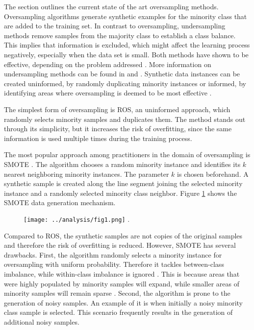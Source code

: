 \documentclass[parskip=full]{scrartcl}
\begin{document}
The section outlines the current state of the art oversampling methods. Oversampling algorithms generate synthetic examples for the minority class that are added to the training set. In contrast to oversampling, undersampling methods remove samples from the majority class to establish a class balance. This implies that information is excluded, which might affect the learning process negatively, especially when the data set is small. Both methods have shown to be effective, depending on the problem addressed \cite{Chawla2002}. More information on undersampling methods can be found in \cite{Ganganwar2012} and \cite{Yen2006}. Synthetic data instances can be created uninformed, by randomly duplicating minority instances or informed, by identifying areas where oversampling is deemed to be most effective \cite{Douzas2018}.

The simplest form of oversampling is ROS, an uninformed approach, which randomly selects minority samples and duplicates them. The method stands out through its simplicity, but it increases the risk of overfitting, since the same information is used multiple times during the training process.

The most popular approach among practitioners in the domain of oversampling is SMOTE \cite{Chawla2002}. The algorithm chooses a random minority instance and identifies its $ k $ nearest neighboring minority instances. The parameter $ k $ is chosen beforehand. A synthetic sample is created along the line segment joining the selected minority instance and a randomly selected minority class neighbor. Figure \ref{fig:Schubach} shows the SMOTE data generation mechanism.

\begin{figure}[H]
	\centering
	\texttt{[image: ../analysis/fig1.png]}
	.
	\label{fig:Schubach}
\end{figure}

Compared to ROS, the synthetic samples are not copies of the original samples and therefore the risk of overfitting is reduced. However, SMOTE has several drawbacks. First, the algorithm randomly selects a minority instance for oversampling with uniform probability. Therefore it tackles between-class imbalance, while within-class imbalance is ignored \cite{Nekooeimehr2016}. This is because areas that were highly populated by minority samples will expand, while smaller areas of minority samples will remain sparse \cite{Prati2004}. Second, the algorithm is prone to the generation of noisy samples. An example of it is when initially a noisy minority class sample is selected. This scenario frequently results in the generation of additional noisy samples.
\end{document}
